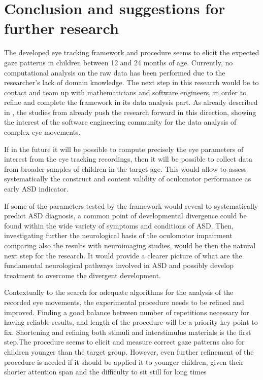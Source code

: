 \chapter{Conclusion and suggestions for further research}
\label{chap:conclusion}

The developed eye tracking framework and procedure seems to elicit the expected gaze patterns in children between 12 and 24 months of age. Currently, no computational analysis on the raw data has been performed due to the researcher’s lack of domain knowledge. The next step in this research would be to contact and team up with mathematicians and software engineers, in order to refine and complete the framework in its data analysis part. As already described in , the studies from  \cite{giordano2017eyetrackersystem,jansson2013smoothpursuit,larsson2015detection} already push the research forward in this direction, showing the interest of the software engineering community for the data analysis of complex eye movements.

If in the future it will be possible to compute precisely the eye parameters of interest from the eye tracking recordings, then it will be possible to collect data from broader samples of children in the target age. This would allow to assess systematically the construct and content validity of oculomotor performance as early ASD indicator.

If some of the parameters tested by the framework would reveal to systematically predict ASD diagnosis, a common point of developmental divergence could be found within the wide variety of symptoms and conditions of ASD. Then, investigating further the neurological basis of the oculomotor impairment comparing also the results with neuroimaging studies, would be then the natural next step for the research. It would provide a clearer picture of what are the fundamental neurological pathways involved in ASD and possibly develop treatment to overcome the divergent development. 

Contextually to the search for adequate algorithms for the analysis of the recorded eye movements, the experimental procedure needs to be refined and improved. Finding a good balance between number of repetitions necessary for having reliable results, and length of the procedure will be a priority key point to fix. Shortening and refining both stimuli and interstimulus materials is the first step.The procedure seems to elicit and measure correct gaze patterns also for children younger than the target group. However, even further refinement of the procedure is needed if it should be applied it to younger children, given their shorter attention span and the difficulty to sit still for long times


